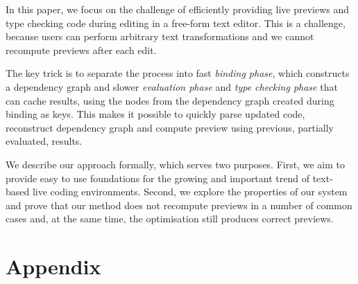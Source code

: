\documentclass[acmsmall,anonymous,fleqn]{acmart}\settopmatter{printfolios=false,printccs=false,printacmref=false}
\theoremstyle{plain}
\theoremstyle{definition}
\begin{document}
In this paper, we focus on the challenge of efficiently providing live previews and type checking
code during editing in a free-form text editor. This is a challenge, because users can perform
arbitrary text transformations and we cannot recompute previews after each edit.

The key trick is to separate the process into fast \emph{binding phase},
which constructs a dependency graph and slower \emph{evaluation phase} and \emph{type checking phase}
that can cache results, using the nodes from the dependency graph created during binding as keys.
This makes it possible to quickly parse updated code, reconstruct dependency graph and compute
preview using previous, partially evaluated, results.

We describe our approach formally, which serves two purposes. First, we aim to provide easy to
use foundations for the growing and important trend of text-based live coding environments.
Second, we explore the properties of our system and prove that our method does not recompute
previews in a number of common cases and, at the same time, the optimisation still produces
correct previews.



\newpage
\appendix

\section{Appendix}
\label{sec:app-correctness}
\end{document}
